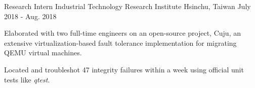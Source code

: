 
\vspace{-2mm}

\begin{cventries}

  \cventry
    {Research Intern} %
    {Industrial Technology Research Institute} %
    {Hsinchu, Taiwan} %
    {July 2018 - Aug. 2018} %
    {
      \begin{cvitems} %
        \item {Elaborated with two full-time engineers on an open-source project, Cuju, an extensive virtualization-based fault tolerance implementation for migrating
        QEMU virtual machines.
        }
        \item {Located and troubleshot 47 integrity failures within a week using official unit tests like \emph{qtest}.
        }
      \end{cvitems}
    }

    \vspace{-2mm}


\end{cventries}
